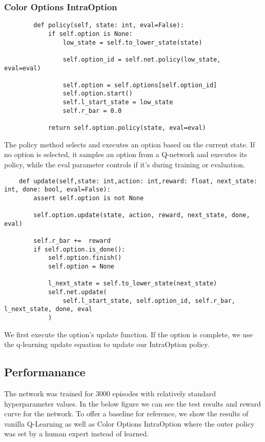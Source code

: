 \documentclass[A4]{article}
\begin{document}
    \subsubsection{Color Options IntraOption}
    \begin{verbatim}
        def policy(self, state: int, eval=False):
            if self.option is None:
                low_state = self.to_lower_state(state)

                self.option_id = self.net.policy(low_state,  eval=eval)

                self.option = self.options[self.option_id]
                self.option.start()
                self.l_start_state = low_state
                self.r_bar = 0.0

            return self.option.policy(state, eval=eval)
    \end{verbatim}

    The policy method selects and executes an option based on the current state. If no option is selected, it samples an option from a Q-network and executes its policy, while the eval parameter controls if it's during training or evaluation.

    \begin{verbatim}
    def update(self,state: int,action: int,reward: float, next_state: int, done: bool, eval=False):
        assert self.option is not None

        self.option.update(state, action, reward, next_state, done, eval)

        self.r_bar +=  reward
        if self.option.is_done():
            self.option.finish()
            self.option = None

            l_next_state = self.to_lower_state(next_state)
            self.net.update(
                self.l_start_state, self.option_id, self.r_bar, l_next_state, done, eval
            )
    \end{verbatim}

    We first execute the option's update function.
    If the option is complete, we use the q-learning update equation to update our IntraOption policy.

    \subsection{Performanance}
    The network was trained for 3000 episodes with relatively standard hyperparameter values.
    In the below figure we can see the test results and reward curve for the network.
    To offer a baseline for reference, we show the results of vanilla Q-Learning
    as well as Color Options IntraOption where the outer policy was set by a human expert instead of learned.
\end{document}
